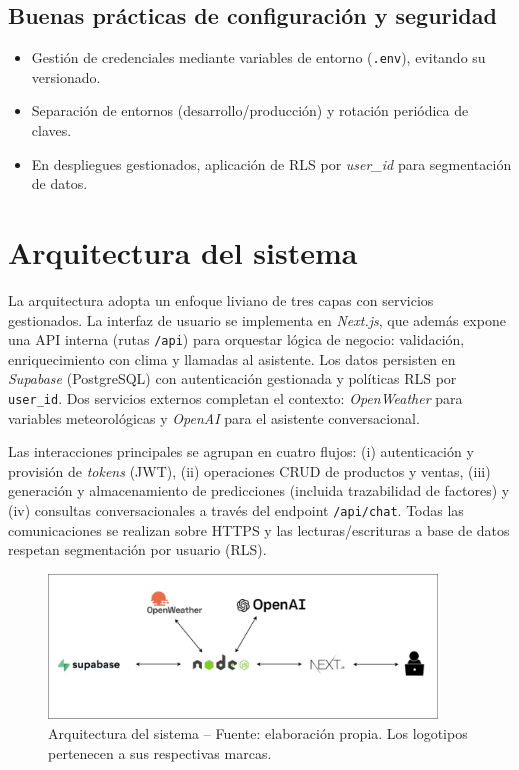 \subsection{Buenas prácticas de configuración y seguridad}
\begin{itemize}
    \item Gestión de credenciales mediante variables de entorno (\texttt{.env}), evitando su versionado.
    \item Separación de entornos (desarrollo/producción) y rotación periódica de claves.
    \item En despliegues gestionados, aplicación de RLS por \textit{user\_id} para segmentación de datos.
\end{itemize}


\vspace{1cm}

\section{Arquitectura del sistema}

La arquitectura adopta un enfoque liviano de tres capas con servicios gestionados. La interfaz de usuario se implementa en \textit{Next.js}, que además expone una API interna (rutas \texttt{/api}) para orquestar lógica de negocio: validación, enriquecimiento con clima y llamadas al asistente. Los datos persisten en \textit{Supabase} (PostgreSQL) con autenticación gestionada y políticas RLS por \texttt{user\_id}. Dos servicios externos completan el contexto: \textit{OpenWeather} para variables meteorológicas y \textit{OpenAI} para el asistente conversacional. 

Las interacciones principales se agrupan en cuatro flujos: (i) autenticación y provisión de \textit{tokens} (JWT), (ii) operaciones CRUD de productos y ventas, (iii) generación y almacenamiento de predicciones (incluida trazabilidad de factores) y (iv) consultas conversacionales a través del endpoint \texttt{/api/chat}. Todas las comunicaciones se realizan sobre HTTPS y las lecturas/escrituras a base de datos respetan segmentación por usuario (RLS).

\begin{figure}[!htbp]
  \centering
  \includegraphics[width=0.92\textwidth]{images/arquitecturaAIVA.png} %
  \caption{Arquitectura del sistema -- Fuente: elaboración propia. 
Los logotipos pertenecen a sus respectivas marcas.}
  \label{fig:arquitectura-aiva}
\end{figure}
\vspace{1cm}

